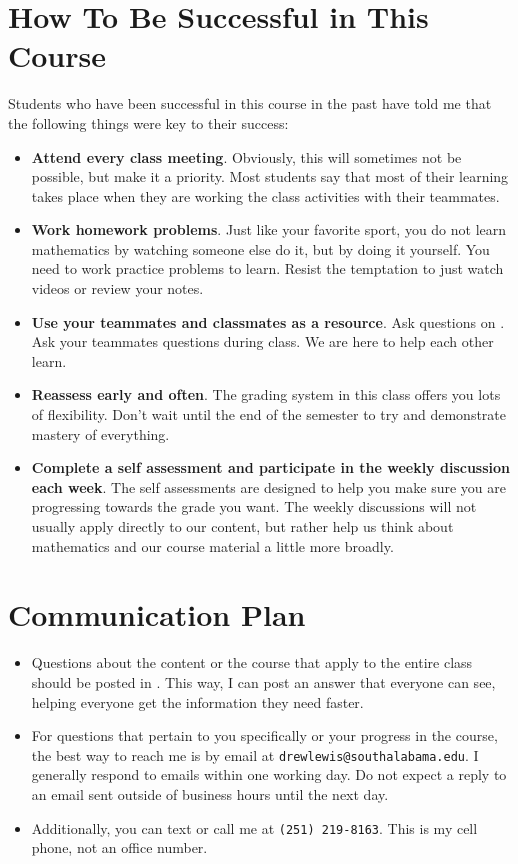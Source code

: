 \documentclass{article}
\begin{document}
\section*{\fontsize{12}{15}\selectfont How To Be Successful in This Course}
Students who have been successful in this course in the past have told me that the following things were key to their success:
\begin{itemize}
\item \textbf{Attend every class meeting}. Obviously, this will sometimes not be possible, but make it a priority. Most students say that most of their learning takes place when they are working the class activities with their teammates.
\item \textbf{Work homework problems}. Just like your favorite sport, you do not learn mathematics by watching someone else do it, but by doing it yourself. You need to work practice problems to learn. Resist the temptation to just watch videos or review your notes.
\item \textbf{Use your teammates and classmates as a resource}. Ask questions on \LMS. Ask your teammates questions during class. We are here to help each other learn.
\item \textbf{Reassess early and often}. The grading system in this class offers you lots of flexibility. Don't wait until the end of the semester to try and demonstrate mastery of everything.
\item \textbf{Complete a self assessment and participate in the weekly discussion each week}. The self assessments are designed to help you make sure you are progressing towards the grade you want. The weekly discussions will not usually apply directly to our content, but rather help us think about mathematics and our course material a little more broadly.
\end{itemize}

\section*{\fontsize{12}{15}\selectfont Communication Plan}

\begin{itemize}
\item Questions about the content or the course that apply to the entire class should be posted in \LMS. This way, I can post an answer that everyone can see, helping everyone get the information they need faster.
\item For questions that pertain to you specifically or your progress in the course, the best way to reach me is by email at {\tt drewlewis@southalabama.edu}. I generally respond to emails within one working day.  Do not expect a reply to an email sent outside of business hours until the next day.
\item Additionally, you can text or call me at {\tt(251) 219-8163}. This is my cell phone, not an office number.
\end{itemize}
\end{document}
